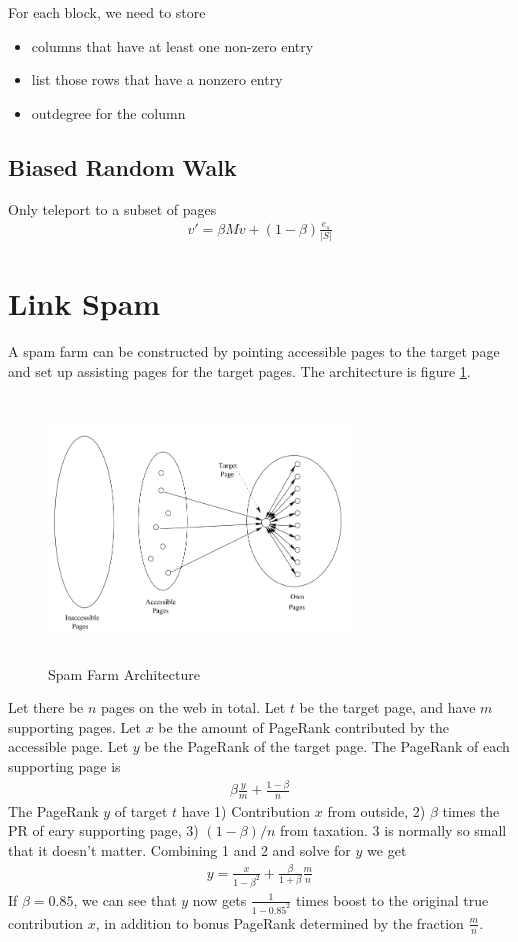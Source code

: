 For each block, we need to store 
    \begin{itemize}
        \item columns that have at least one non-zero entry 
        \item list those rows that have a nonzero entry 
        \item outdegree for the column
    \end{itemize}
    
\subsection{Biased Random Walk} 
Only teleport to a subset of pages
\begin{align*}
    v' = \beta M v + (1 - \beta) \frac{e_s}{|S|}
\end{align*}


\section{Link Spam}
A spam farm can be constructed by pointing accessible pages to the target page and set up assisting pages for the target pages. The architecture is figure \ref{fig:spam_farm}. 
\begin{figure}[h]
    \centering
    \includegraphics[height = 7cm, width = 8cm]{figs/004_spam_farm.PNG}
    \caption{Spam Farm Architecture}
    \label{fig:spam_farm}
\end{figure}
Let there be $n$ pages on the web in total. Let $t$ be the target page, and have $m$ supporting pages. Let $x$ be the amount of PageRank contributed by the accessible page. Let $y$ be the PageRank of the target page. The PageRank of each supporting page is 
    \begin{align*}
        \beta \frac{y}{m} + \frac{1 - \beta}{n}
    \end{align*}
The PageRank $y$ of target $t$ have 1) Contribution $x$ from outside, 2) $\beta$ times the PR of eary supporting page, 3) $(1-\beta)/n$ from taxation. 3 is normally so small that it doesn't matter. Combining 1 and 2 and solve for $y$ we get 
    \begin{align*}
        y = \frac{x}{1-\beta^2} + \frac{\beta}{1+\beta}\frac{m}{n}
    \end{align*}
If $\beta = 0.85$, we can see that $y$ now gets $\frac{1}{1-0.85^2}$ times boost to the original true contribution $x$, in addition to bonus PageRank determined by the fraction $\frac{m}{n}$. 

